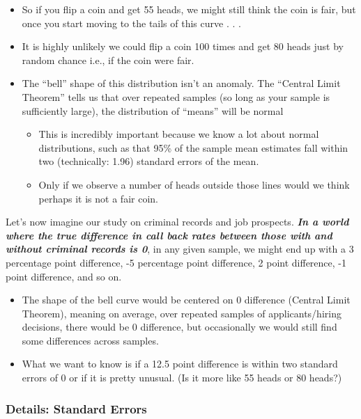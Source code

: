 \documentclass[
  letterpaper,
  DIV=11,
  numbers=noendperiod]{scrreprt}
\providecommand{\tightlist}{%
  \setlength{\itemsep}{0pt}\setlength{\parskip}{0pt}}\usepackage{longtable,booktabs,array}
\begin{document}
\begin{itemize}
\tightlist
\item
  So if you flip a coin and get 55 heads, we might still think the coin
  is fair, but once you start moving to the tails of this curve . . .
\item
  It is highly unlikely we could flip a coin 100 times and get 80 heads
  just by random chance i.e., if the coin were fair.
\item
  The ``bell'' shape of this distribution isn't an anomaly. The
  ``Central Limit Theorem'' tells us that over repeated samples (so long
  as your sample is sufficiently large), the distribution of ``means''
  will be normal

  \begin{itemize}
  \tightlist
  \item
    This is incredibly important because we know a lot about normal
    distributions, such as that 95\% of the sample mean estimates fall
    within two (technically: 1.96) standard errors of the mean.
  \item
    Only if we observe a number of heads outside those lines would we
    think perhaps it is not a fair coin.
  \end{itemize}
\end{itemize}

Let's now imagine our study on criminal records and job prospects.
\textbf{\emph{In a world where the true difference in call back rates
between those with and without criminal records is 0}}, in any given
sample, we might end up with a 3 percentage point difference, -5
percentage point difference, 2 point difference, -1 point difference,
and so on.

\begin{itemize}
\tightlist
\item
  The shape of the bell curve would be centered on 0 difference (Central
  Limit Theorem), meaning on average, over repeated samples of
  applicants/hiring decisions, there would be 0 difference, but
  occasionally we would still find some differences across samples.
\item
  What we want to know is if a 12.5 point difference is within two
  standard errors of 0 or if it is pretty unusual. (Is it more like 55
  heads or 80 heads?)
\end{itemize}

\hypertarget{details-standard-errors}{%
\subsubsection{Details: Standard Errors}\label{details-standard-errors}}
\end{document}
